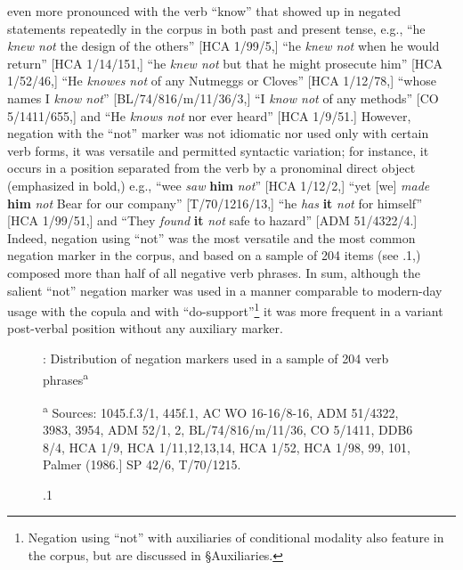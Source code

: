 even more pronounced with the verb “know” that showed up in negated statements repeatedly in the corpus in both past and present tense, e.g., “he \textit{knew not} the design of the others” [HCA 1/99/5,] “he \textit{knew not} when he would return” [HCA 1/14/151,] “he \textit{knew not} but that he might prosecute him” [HCA 1/52/46,] “He \textit{knowes not} of any Nutmeggs or Cloves” [HCA 1/12/78,] “whose names I \textit{know not}” [BL/74/816/m/11/36/3,] “I \textit{know not} of any methods” [CO 5/1411/655,] and “He \textit{knows not} nor ever heard” [HCA 1/9/51.] However, negation with the “not” marker was not idiomatic nor used only with certain verb forms, it was versatile and permitted syntactic variation; for instance, it occurs in a position separated from the verb by a pronominal direct object (emphasized in bold,) e.g., “wee \textit{saw}\textbf{ }\textbf{him} \textit{not}” [HCA 1/12/2,] “yet [we] \textit{made} \textbf{him} \textit{not} Bear for our company” [T/70/1216/13,] “he \textit{has} \textbf{it} \textit{not} for himself” [HCA 1/99/51,] and “They \textit{found} \textbf{it} \textit{not} safe to hazard” [ADM 51/4322/4.] Indeed, negation using “not” was the most versatile and the most common negation marker in the corpus, and based on a sample of 204 items (see .1,) composed more than half of all negative verb phrases. In sum, although the salient “not” negation marker was used in a manner comparable to modern-day usage with the copula and with “do-support”\footnote{Negation using “not” with auxiliaries of conditional modality also feature in the corpus, but are discussed in §Auxiliaries.} it was more frequent in a variant post-verbal position without any auxiliary marker.

  
\begin{figure}


\caption{\label{fig:key:6}.1}: Distribution of negation markers used in a sample of 204 verb phrases\textsuperscript{a} 

\textsuperscript{a} Sources: 1045.f.3/1, 445f.1, AC WO 16-16/8-16, ADM 51/4322, 3983, 3954, ADM 52/1, 2, BL/74/816/m/11/36, CO 5/1411, DDB6 8/4, HCA 1/9, HCA 1/11,12,13,14, HCA 1/52, HCA 1/98, 99, 101, Palmer (1986.] SP 42/6, T/70/1215.
\end{figure}


